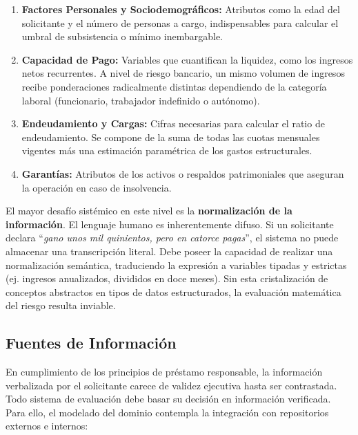 \documentclass[12pt,a4paper]{report}
\begin{document}
\begin{enumerate}
    \item \textbf{Factores Personales y Sociodemográficos:} Atributos como la edad del solicitante y el número de personas a cargo, indispensables para calcular el umbral de subsistencia o mínimo inembargable.
    \item \textbf{Capacidad de Pago:} Variables que cuantifican la liquidez, como los ingresos netos recurrentes. A nivel de riesgo bancario, un mismo volumen de ingresos recibe ponderaciones radicalmente distintas dependiendo de la categoría laboral (funcionario, trabajador indefinido o autónomo).
    \item \textbf{Endeudamiento y Cargas:} Cifras necesarias para calcular el ratio de endeudamiento. Se compone de la suma de todas las cuotas mensuales vigentes más una estimación paramétrica de los gastos estructurales.
    \item \textbf{Garantías:} Atributos de los activos o respaldos patrimoniales que aseguran la operación en caso de insolvencia.
\end{enumerate}

El mayor desafío sistémico en este nivel es la \textbf{normalización de la información}. El lenguaje humano es inherentemente difuso. Si un solicitante declara ``\textit{gano unos mil quinientos, pero en catorce pagas}'', el sistema no puede almacenar una transcripción literal. Debe poseer la capacidad de realizar una normalización semántica, traduciendo la expresión a variables tipadas y estrictas (ej. ingresos anualizados, divididos en doce meses). Sin esta cristalización de conceptos abstractos en tipos de datos estructurados, la evaluación matemática del riesgo resulta inviable.

\subsection{Fuentes de Información}

En cumplimiento de los principios de préstamo responsable, la información verbalizada por el solicitante carece de validez ejecutiva hasta ser contrastada. Todo sistema de evaluación debe basar su decisión en información verificada. Para ello, el modelado del dominio contempla la integración con repositorios externos e internos:
\end{document}
